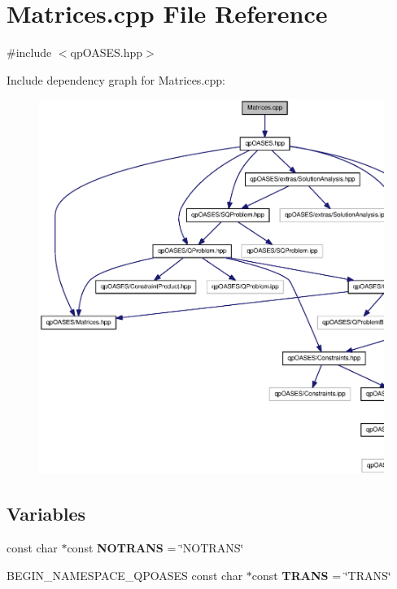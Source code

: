 \section{Matrices.cpp File Reference}
\label{Matrices_8cpp}
{\ttfamily \#include $<$qpOASES.hpp$>$}\par
Include dependency graph for Matrices.cpp:
\nopagebreak
\begin{figure}[H]
\begin{center}
\leavevmode
\includegraphics[width=400pt]{Matrices_8cpp__incl}
\end{center}
\end{figure}
\subsection*{Variables}
\begin{DoxyCompactItemize}
\item 
const char $\ast$const {\bf NOTRANS} = \char`\"{}NOTRANS\char`\"{}
\item 
BEGIN\_\-NAMESPACE\_\-QPOASES const char $\ast$const {\bf TRANS} = \char`\"{}TRANS\char`\"{}
\end{DoxyCompactItemize}


